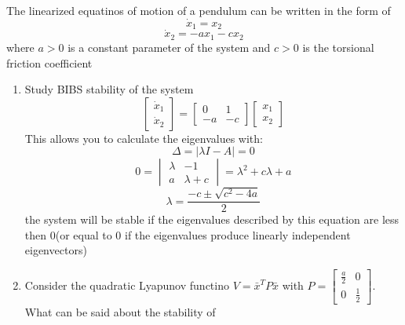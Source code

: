 \item The linearized equatinos of motion of a pendulum can be written in the form of
  \begin{equation}
    \dot x_1 = x_2
  \end{equation}
  \begin{equation}
    \dot x_2 = -ax_1 - cx_2
  \end{equation}
  where $a > 0$ is a constant parameter of the system and $c > 0$ is the torsional friction coefficient
  \begin{enumerate}
  \item Study BIBS stability of the system\\
    \begin{equation}
      \begin{bmatrix}
        \dot x_1 \\
        \dot x_2 
      \end{bmatrix} =
      \begin{bmatrix}
        0 & 1 \\
        -a & -c
      \end{bmatrix}
      \begin{bmatrix}
        x_1 \\
        x_2
      \end{bmatrix}
    \end{equation}
    This allows you to calculate the eigenvalues with:
    \begin{equation}
      \Delta = \vert \lambda I - A \vert = 0
    \end{equation}
    \begin{equation}
      0 =
      \begin{vmatrix}
        \lambda & -1 \\
        a & \lambda + c
      \end{vmatrix} =
      \lambda^2 + c\lambda + a
    \end{equation}
    \begin{equation}
      \lambda = \frac{-c \pm \sqrt{c^2 - 4a}}{2}
    \end{equation}
    the system will be stable if the eigenvalues described by this equation are less then 0(or equal to 0 if
    the eigenvalues produce linearly independent eigenvectors)
  \item Consider the quadratic Lyapunov functino $V = \bar x^T P \bar x$ with
    $P = \begin{bmatrix} \frac a 2 & 0 \\ 0 & \frac 1 2\end{bmatrix}$. What can be said about the stability of

\end{enumerate}
